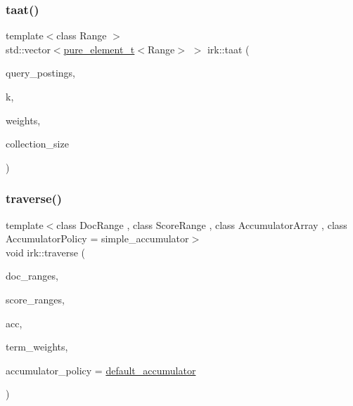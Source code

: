 \subsubsection{\texorpdfstring{taat()}{taat()}}
{\footnotesize\ttfamily template$<$class Range $>$ \\
std\+::vector$<$\mbox{\hyperlink{namespaceirk_a1e48b43a3f40d553264380da5e7263c1}{pure\+\_\+element\+\_\+t}}$<$Range$>$ $>$ irk\+::taat (\begin{DoxyParamCaption}\item[{const std\+::vector$<$ Range $>$ \&}]{query\+\_\+postings,  }\item[{std\+::size\+\_\+t}]{k,  }\item[{const std\+::vector$<$ \mbox{\hyperlink{namespaceirk_a87bce44d1e3fdff0b1b3bb78f2a5f924}{score\+\_\+t}}$<$ \mbox{\hyperlink{namespaceirk_a1e48b43a3f40d553264380da5e7263c1}{pure\+\_\+element\+\_\+t}}$<$ Range $>$$>$$>$ \&}]{weights,  }\item[{std\+::size\+\_\+t}]{collection\+\_\+size }\end{DoxyParamCaption})}

\mbox{\label{namespaceirk_a338c8931f92a0d5db3023a2ee7a76db8}} 
\subsubsection{\texorpdfstring{traverse()}{traverse()}}
{\footnotesize\ttfamily template$<$class Doc\+Range , class Score\+Range , class Accumulator\+Array , class Accumulator\+Policy  = simple\+\_\+accumulator$>$ \\
void irk\+::traverse (\begin{DoxyParamCaption}\item[{const std\+::vector$<$ Doc\+Range $>$ \&}]{doc\+\_\+ranges,  }\item[{const std\+::vector$<$ Score\+Range $>$ \&}]{score\+\_\+ranges,  }\item[{Accumulator\+Array \&}]{acc,  }\item[{const std\+::vector$<$ \mbox{\hyperlink{namespaceirk_a1e48b43a3f40d553264380da5e7263c1}{pure\+\_\+element\+\_\+t}}$<$ Score\+Range $>$$>$ \&}]{term\+\_\+weights,  }\item[{Accumulator\+Policy \&}]{accumulator\+\_\+policy = {\ttfamily \mbox{\hyperlink{namespaceirk_ab2909e62b829f7926f8d47d3146d9939}{default\+\_\+accumulator}}} }\end{DoxyParamCaption})}



